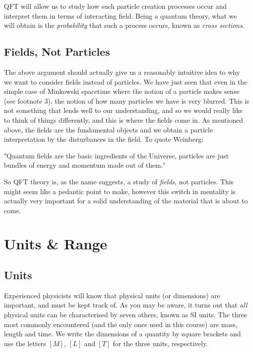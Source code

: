 QFT will allow us to study how such particle creation processes occur and interpret them in terms of interacting field. Being a quantum theory, what we will obtain is the \textit{probability} that such a process occurs, known as \textit{cross sections}. 

\subsection{Fields, Not Particles}

The above argument should actually give us a reasonably intuitive idea to why we want to consider fields instead of particles. We have just seen that even in the simple case of Minkowski spacetime where the notion of a particle makes sense (see footnote 3), the notion of how many particles we have is very blurred. This is not something that lends well to our understanding, and so we would really like to think of things differently, and this is where the fields come in. As mentioned above, the fields are the fundamental objects and we obtain a particle interpretation by the disturbances in the field. To quote Weinberg:

\begin{center}
    "Quantum fields are the basic ingredients of the Universe, particles are just bundles of energy and momentum made out of them."
\end{center}

So QFT theory is, as the name suggests, a study of \textit{fields}, not particles. This might seem like a pedantic point to make, however this switch in mentality is actually very important for a solid understanding of the material that is about to come.

\section{Units \& Range}

\subsection{Units}

Experienced physicists will know that physical units (or dimensions) are important, and must be kept track of. As you may be aware, it turns out that \textit{all} physical units can be characterised by seven others, known as SI units. The three most commonly encountered (and the only ones used in this course) are mass, length and time. We write the dimensions of a quantity by square brackets and use the letters $[M]$, $[L]$ and $[T]$ for the three units, respectively.


